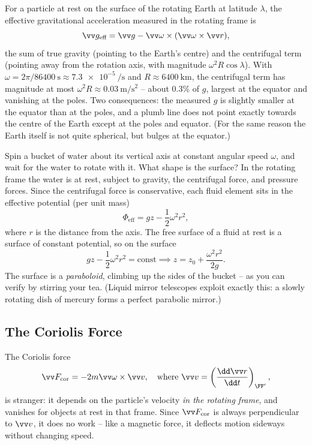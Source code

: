 \begin{example}
	For a particle at rest on the surface of the rotating Earth at latitude $\lambda$, the effective gravitational acceleration measured in the rotating frame is
	$$
	\vv g_{\text{eff}} = \vv g - \vv \omega \times (\vv \omega \times \vv r),
	$$
	the sum of true gravity (pointing to the Earth's centre) and the centrifugal term (pointing away from the rotation axis, with magnitude $\omega^2 R \cos \lambda$). With $\omega = 2\pi/\SI{86400}{\second} \approx \SI{7.3e-5}{\per\second}$ and $R \approx \SI{6400}{\kilo\meter}$, the centrifugal term has magnitude at most $\omega^2 R \approx \SI{0.03}{\meter\per\second\squared}$ -- about $0.3\%$ of $g$, largest at the equator and vanishing at the poles. Two consequences: the measured $g$ is slightly smaller at the equator than at the poles, and a plumb line does not point exactly towards the centre of the Earth except at the poles and equator. (For the same reason the Earth itself is not quite spherical, but bulges at the equator.)
\end{example}

\begin{example}
	Spin a bucket of water about its vertical axis at constant angular speed $\omega$, and wait for the water to rotate with it. What shape is the surface? In the rotating frame the water is at rest, subject to gravity, the centrifugal force, and pressure forces. Since the centrifugal force is conservative, each fluid element sits in the effective potential (per unit mass)
	$$
	\Phi_{\text{eff}} = g z - \frac{1}{2}\omega^2 r^2,
	$$
	where $r$ is the distance from the axis. The free surface of a fluid at rest is a surface of constant potential, so on the surface
	$$
	gz - \frac{1}{2}\omega^2 r^2 = \text{const} \implies z = z_0 + \frac{\omega^2 r^2}{2g}.
	$$
	The surface is a \emph{paraboloid}, climbing up the sides of the bucket -- as you can verify by stirring your tea. (Liquid mirror telescopes exploit exactly this: a slowly rotating dish of mercury forms a perfect parabolic mirror.)
\end{example}

\subsection{The Coriolis Force}

The Coriolis force
$$
\vv F_{\text{cor}} = -2m \vv \omega \times \vv v, \quad \text{where } \vv v = \left(\frac{\dd \vv r}{\dd t}\right)_{\FF'},
$$
is stranger: it depends on the particle's velocity \emph{in the rotating frame}, and vanishes for objects at rest in that frame. Since $\vv F_{\text{cor}}$ is always perpendicular to $\vv v$, it does no work -- like a magnetic force, it deflects motion sideways without changing speed.

